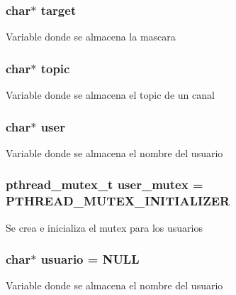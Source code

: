 \subsubsection[{target}]{\setlength{\rightskip}{0pt plus 5cm}char$\ast$ target}\label{_g-2361-06-_p1-_server_8c_a23b26cdb3a71f525caf03b57f68d47fa}
Variable donde se almacena la mascara \hypertarget{_g-2361-06-_p1-_server_8c_affecb48e716753e10b44feac31f12529}{}
\subsubsection[{topic}]{\setlength{\rightskip}{0pt plus 5cm}char$\ast$ topic}\label{_g-2361-06-_p1-_server_8c_affecb48e716753e10b44feac31f12529}
Variable donde se almacena el topic de un canal \hypertarget{_g-2361-06-_p1-_server_8c_a14871705f45ccdc5bb9f4549efd8e119}{}
\subsubsection[{user}]{\setlength{\rightskip}{0pt plus 5cm}char$\ast$ user}\label{_g-2361-06-_p1-_server_8c_a14871705f45ccdc5bb9f4549efd8e119}
Variable donde se almacena el nombre del usuario \hypertarget{_g-2361-06-_p1-_server_8c_a5dedd07a1144d2ab70b74a8e64b6a7c0}{}
\subsubsection[{user\+\_\+mutex}]{\setlength{\rightskip}{0pt plus 5cm}pthread\+\_\+mutex\+\_\+t user\+\_\+mutex = P\+T\+H\+R\+E\+A\+D\+\_\+\+M\+U\+T\+E\+X\+\_\+\+I\+N\+I\+T\+I\+A\+L\+I\+Z\+E\+R}\label{_g-2361-06-_p1-_server_8c_a5dedd07a1144d2ab70b74a8e64b6a7c0}
Se crea e inicializa el mutex para los usuarios \hypertarget{_g-2361-06-_p1-_server_8c_a0147a5b81499984f9cb00379a8cb84af}{}
\subsubsection[{usuario}]{\setlength{\rightskip}{0pt plus 5cm}char$\ast$ usuario = N\+U\+L\+L}\label{_g-2361-06-_p1-_server_8c_a0147a5b81499984f9cb00379a8cb84af}
Variable donde se almacena el nombre del usuario 